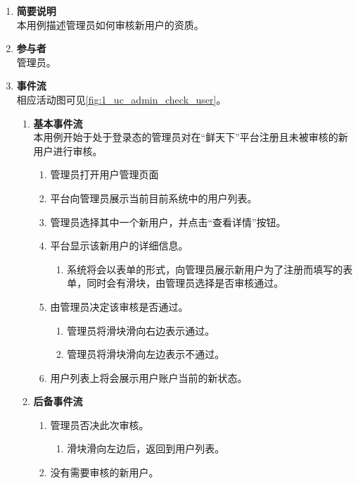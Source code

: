 \begin{enumerate}
	\item \textbf{简要说明}  \\ 本用例描述管理员如何审核新用户的资质。
	\item \textbf{参与者} \\ 管理员。
	\item \textbf{事件流} \\ 相应活动图可见\autoref{fig:1_uc_admin_check_user}。
	\begin{enumerate} 
        \item \textbf{基本事件流} \\ 本用例开始于处于登录态的管理员对在“鲜天下”平台注册且未被审核的新用户进行审核。
        \begin{enumerate}
            \item 管理员打开用户管理页面
            \item 平台向管理员展示当前目前系统中的用户列表。
            \item 管理员选择其中一个新用户，并点击“查看详情”按钮。
            \item 平台显示该新用户的详细信息。
            \begin{enumerate}
                \item 系统将会以表单的形式，向管理员展示新用户为了注册而填写的表单，同时会有滑块，由管理员选择是否审核通过。
            \end{enumerate}
            \item 由管理员决定该审核是否通过。
            \begin{enumerate}
                \item 管理员将滑块滑向右边表示通过。
                \item 管理员将滑块滑向左边表示不通过。
            \end{enumerate}
            \item 用户列表上将会展示用户账户当前的新状态。
        \end{enumerate}
        \item \textbf{后备事件流} \\
        \begin{enumerate}
            \item 管理员否决此次审核。
            \begin{enumerate}
                \item 滑块滑向左边后，返回到用户列表。
            \end{enumerate}
            \item 没有需要审核的新用户。

\end{enumerate}
\end{enumerate}
\end{enumerate}
